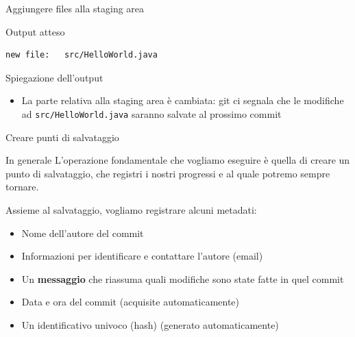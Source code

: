 \documentclass[presentation]{beamer}
\begin{document}
\begin{frame}{Aggiungere files alla staging area}
\begin{block}{Output atteso}
\begin{Verbatim}[fontsize=\scriptsize]
        new file:   src/HelloWorld.java	 
			\end{Verbatim}
	\end{block}
	\begin{block}{Spiegazione dell'output}
		\begin{itemize}
			\item La parte relativa alla staging area è cambiata: git ci segnala che le modifiche ad \texttt{src/HelloWorld.java} saranno salvate al prossimo commit
		\end{itemize}
	\end{block}
\end{frame}

\begin{frame}{Creare punti di salvataggio}
	\begin{block}{In generale}
		L'operazione fondamentale che vogliamo eseguire è quella di creare un punto di salvataggio, che registri i nostri progressi e al quale potremo sempre tornare.
		
		Assieme al salvataggio, vogliamo registrare alcuni metadati:
		\begin{itemize}
			\item Nome dell'autore del commit
			\item Informazioni per identificare e contattare l'autore (email)
			\item Un \textbf{messaggio} che riassuma quali modifiche sono state fatte in quel commit
			\item Data e ora del commit (acquisite automaticamente)
			\item Un identificativo univoco (hash) (generato automaticamente)
		\end{itemize}
		

\end{block}
\end{frame}
\end{document}
